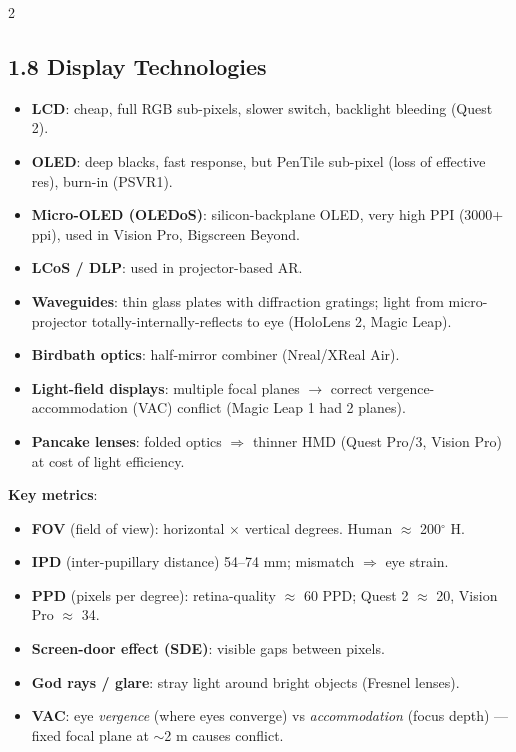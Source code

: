 \begin{paracol}{2}
\subsection*{1.8 Display Technologies}
\begin{itemize}[leftmargin=*,nosep]
  \item \textbf{LCD}: cheap, full RGB sub-pixels, slower switch, backlight bleeding (Quest 2).
  \item \textbf{OLED}: deep blacks, fast response, but PenTile sub-pixel (loss of effective res), burn-in (PSVR1).
  \item \textbf{Micro-OLED (OLEDoS)}: silicon-backplane OLED, very high PPI (3000+ ppi), used in Vision Pro, Bigscreen Beyond.
  \item \textbf{LCoS / DLP}: used in projector-based AR.
  \item \textbf{Waveguides}: thin glass plates with diffraction gratings; light from micro-projector totally-internally-reflects to eye (HoloLens 2, Magic Leap).
  \item \textbf{Birdbath optics}: half-mirror combiner (Nreal/XReal Air).
  \item \textbf{Light-field displays}: multiple focal planes $\to$ correct vergence-accommodation (VAC) conflict (Magic Leap 1 had 2 planes).
  \item \textbf{Pancake lenses}: folded optics $\Rightarrow$ thinner HMD (Quest Pro/3, Vision Pro) at cost of light efficiency.
\end{itemize}
\textbf{Key metrics}:
\begin{itemize}[leftmargin=*,nosep]
  \item \textbf{FOV} (field of view): horizontal $\times$ vertical degrees. Human $\approx$ 200$^\circ$ H.
  \item \textbf{IPD} (inter-pupillary distance) 54–74 mm; mismatch $\Rightarrow$ eye strain.
  \item \textbf{PPD} (pixels per degree): retina-quality $\approx$ 60 PPD; Quest 2 $\approx$ 20, Vision Pro $\approx$ 34.
  \item \textbf{Screen-door effect (SDE)}: visible gaps between pixels.
  \item \textbf{God rays / glare}: stray light around bright objects (Fresnel lenses).
  \item \textbf{VAC}: eye \emph{vergence} (where eyes converge) vs \emph{accommodation} (focus depth) — fixed focal plane at $\sim$2 m causes conflict.
\end{itemize}


\end{paracol}
